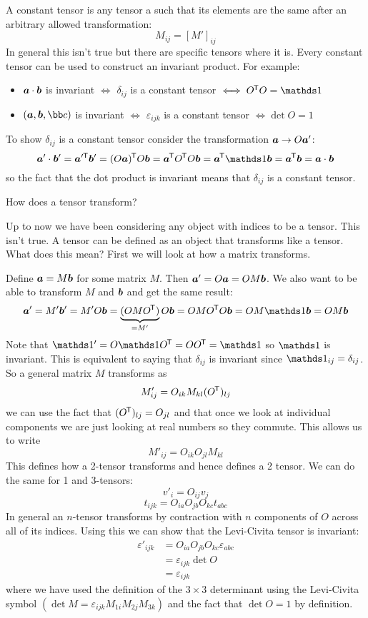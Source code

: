 \documentclass{article}
\begin{document}
    A constant tensor is any tensor a such that its elements are the same after an arbitrary allowed transformation:
    \[M_{ij} = [M']_{ij}\]
    In general this isn't true but there are specific tensors where it is.
    Every constant tensor can be used to construct an invariant product.
    For example:
    \begin{itemize}
        \item \(\bm{a}\cdot\bm{b}\) is invariant \(\iff\) \(\delta_{ij}\) is a constant tensor \(\iff O\trans O = \ident\)
        \item \((\vv a, \vv b, \bb c)\) is invariant \(\iff\) \(\varepsilon_{ijk}\) is a constant tensor \(\iff \det O = 1\)
    \end{itemize}
    To show \(\delta_{ij}\) is a constant tensor consider the transformation \(\bm{a}\to O\bm{a}'\):
    \[\vv a'\cdot\vv b' = \vv a'{}\trans\vv b' = (O\vv a)\trans O\vv b = \vv a\trans O\trans O\vv b = \vv a\trans\ident\vv b = \vv a\trans\vv b = \vv a\cdot\vv b\]
    so the fact that the dot product is invariant means that \(\delta_{ij}\) is a constant tensor.
    
    How does a tensor transform?
    
    Up to now we have been considering any object with indices to be a tensor.
    This isn't true.
    A tensor can be defined as an object that transforms like a tensor.
    What does this mean?
    First we will look at how a matrix transforms.
    
    Define \(\bm{a} = M\bm{b}\) for some matrix \(M\).
    Then \(\bm{a}' = O\bm{a} = OM\bm{b}\).
    We also want to be able to transform \(M\) and \(\bm{b}\) and get the same result:
    \[\vv a' = M'\vv b' = M'O\vv b = \underbrace{(OMO\trans)}_{=M'}O\vv b = OMO\trans O\vv b = OM\ident \vv b= OM\vv b\]
    Note that \(\ident' = O\ident O\trans = OO\trans = \ident\) so \(\ident\) is invariant.
    This is equivalent to saying that \(\delta_{ij}\) is invariant since \(\ident_{ij} = \delta_{ij}\).
    So a general matrix \(M\) transforms as
    \[M'_{ij} = O_{ik}M_{kl}(O^{\mkern-1.5mu\mathsf{T}})_{lj}\]
    we can use the fact that \((O^{\mkern-1.5mu\mathsf{T}})_{lj} = O_{jl}\) and that once we look at individual components we are just looking at real numbers so they commute.
    This allows us to write
    \[M'_{ij} = O_{ik}O_{jl}M_{kl}\]
    This defines how a 2-tensor transforms and hence defines a 2 tensor.
    We can do the same for 1 and 3-tensors:
    \[v'_i = O_{ij}v_j\]
    \[t_{ijk} = O_{ia}O_{jb}O_{kc}t_{abc}\]
    In general an \(n\)-tensor transforms by contraction with \(n\) components of \(O\) across all of its indices.
    Using this we can show that the Levi-Civita tensor is invariant:
    \begin{align*}
    \varepsilon'_{ijk} &= O_{ia}O_{jb}O_{kc}\varepsilon_{abc}\\
    &= \varepsilon_{ijk}\det O\\
    &= \varepsilon_{ijk}
    \end{align*}
    where we have used the definition of the \(3\times 3\) determinant using the Levi-Civita symbol \((\det M = \varepsilon_{ijk}M_{1i}M_{2j}M_{3k})\) and the fact that \(\det O = 1\) by definition.
    
\end{document}
